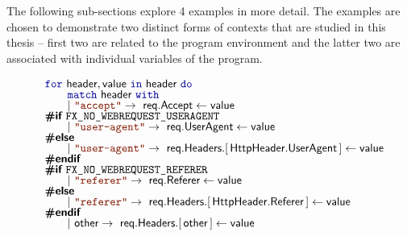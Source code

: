 The following sub-sections explore 4 examples in more detail. The examples are chosen to
demonstrate two distinct forms of contexts that are studied in this thesis -- first two are
related to the program environment and the latter two are associated with individual variables of 
the program.


\begin{figure}
\begin{equation*}
\begin{array}{l}
\kvd{for}~\ident{header},\ident{value}~\kvd{in}~\ident{header}~\kvd{do}\\[-0.25em]
\hspace{2em}\kvd{match}~\ident{header}~\kvd{with}\\[-0.25em]
\hspace{2em}|~\str{accept} \rightarrow~ \ident{req.Accept} \leftarrow \ident{value}\\[-0.25em]
%
\prepk{\#if}~\prepi{FX\_NO\_WEBREQUEST\_USERAGENT}\\[-0.25em]
\hspace{2em}|~\str{user-agent} \rightarrow~ \ident{req.UserAgent} \leftarrow \ident{value}\\[-0.25em]
\prepk{\#else}\\[-0.25em]
\hspace{2em}|~\str{user-agent} \rightarrow~
  \ident{req.Headers}.[\,\ident{HttpHeader.UserAgent}\,] \leftarrow \ident{value}\\[-0.25em]
\prepk{\#endif}\\[-0.25em]
%
\prepk{\#if}~\prepi{FX\_NO\_WEBREQUEST\_REFERER}\\[-0.25em]
\hspace{2em}|~\str{referer} \rightarrow~ \ident{req.Referer} \leftarrow \ident{value}\\[-0.25em]
\prepk{\#else}\\[-0.25em]
\hspace{2em}|~\str{referer} \rightarrow~
  \ident{req.Headers}.[\,\ident{HttpHeader.Referer}\,] \leftarrow \ident{value}\\[-0.25em]
\prepk{\#endif}\\[-0.25em]
%
\hspace{2em}|~\ident{other} \rightarrow~ \ident{req.Headers}.[\,\ident{other}\,] \leftarrow \ident{value}\\[-0.25em]
\end{array}
\end{equation*}

\label{fig:introduction-context-http}
\end{figure}

